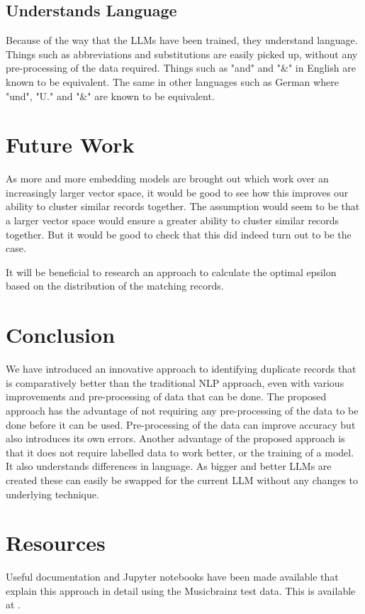 \documentclass{article}
\begin{document}
\subsection{Understands Language}
Because of the way that the LLMs have been trained, they understand language. Things such as abbreviations and substitutions are easily picked up, without any pre-processing of the data required. Things such as "and" and "\&" in English are known to be equivalent. The same in other languages such as German where "und", "U." and "\&" are known to be equivalent.

\section{Future Work}
As more and more embedding models are brought out which work over an increasingly larger vector space, it would be good to see how this improves our ability to cluster similar records together. The assumption would seem to be that a larger vector space would ensure a greater ability to cluster similar records together. But it would be good to check that this did indeed turn out to be the case.

It will be beneficial to research an approach to calculate the optimal epsilon based on the distribution of the matching records.

\section{Conclusion}
We have introduced an innovative approach to identifying duplicate records that is comparatively better than the traditional NLP approach, even with various improvements and pre-processing of data that can be done. The proposed approach has the advantage of not requiring any pre-processing of the data to be done before it can be used. Pre-processing of the data can improve accuracy but also introduces its own errors. Another advantage of the proposed approach is that it does not require labelled data to work better, or the training of a model. It also understands differences in language. As bigger and better LLMs are created these can easily be swapped for the current LLM without any changes to underlying technique.

\section{Resources}
Useful documentation and Jupyter notebooks have been made available that explain this approach in detail using the Musicbrainz test data. This is available at \cite{genai-dedup-resources}.
\end{document}
